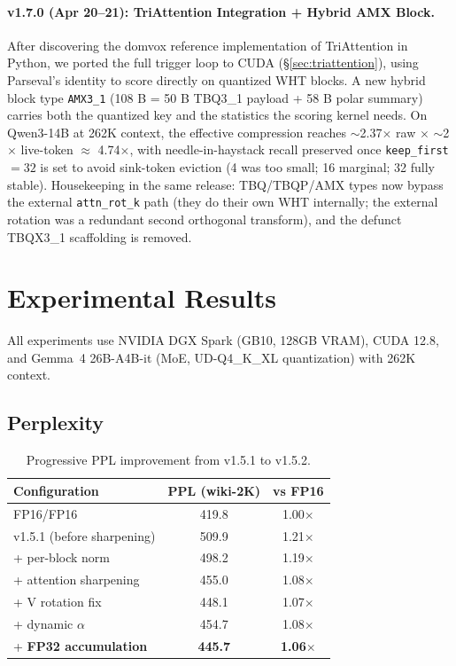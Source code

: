 \documentclass[10pt,twocolumn]{article}
\begin{document}
\paragraph{v1.7.0 (Apr 20--21): TriAttention Integration + Hybrid AMX Block.}
After discovering the domvox reference implementation of TriAttention in Python, we ported the full trigger loop to CUDA (\S\ref{sec:triattention}), using Parseval's identity to score directly on quantized WHT blocks. A new hybrid block type \texttt{AMX3\_1} (108 B = 50 B TBQ3\_1 payload + 58 B polar summary) carries both the quantized key and the statistics the scoring kernel needs. On Qwen3-14B at 262K context, the effective compression reaches $\sim$2.37$\times$ raw $\times$ $\sim$2$\times$ live-token $\approx$ 4.74$\times$, with needle-in-haystack recall preserved once \texttt{keep\_first} $= 32$ is set to avoid sink-token eviction (4 was too small; 16 marginal; 32 fully stable). Housekeeping in the same release: TBQ/TBQP/AMX types now bypass the external \texttt{attn\_rot\_k} path (they do their own WHT internally; the external rotation was a redundant second orthogonal transform), and the defunct TBQX3\_1 scaffolding is removed.

\section{Experimental Results}
\label{sec:results}

All experiments use NVIDIA DGX Spark (GB10, 128GB VRAM), CUDA 12.8, and Gemma~4 26B-A4B-it (MoE, UD-Q4\_K\_XL quantization) with 262K context.

\subsection{Perplexity}

\begin{table}[h]
\centering
\small
\begin{tabular}{@{}lcc@{}}
\toprule
Configuration & PPL (wiki-2K) & vs FP16 \\
\midrule
FP16/FP16 & 419.8 & 1.00$\times$ \\
\midrule
v1.5.1 (before sharpening) & 509.9 & 1.21$\times$ \\
+ per-block norm & 498.2 & 1.19$\times$ \\
+ attention sharpening & 455.0 & 1.08$\times$ \\
+ V rotation fix & 448.1 & 1.07$\times$ \\
+ dynamic $\alpha$ & 454.7 & 1.08$\times$ \\
+ \textbf{FP32 accumulation} & \textbf{445.7} & \textbf{1.06$\times$} \\
\bottomrule
\end{tabular}
\caption{Progressive PPL improvement from v1.5.1 to v1.5.2.}
\label{tab:ppl_progress}
\end{table}
\end{document}
